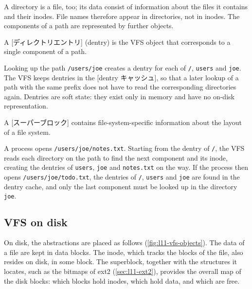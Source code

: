 \documentclass[../main.tex]{subfiles}
\begin{document}
A directory is a file, too; its data consist of information about the files
it contains and their inodes.  File names therefore appear in directories,
not in inodes.  The components of a path are represented by further objects.

\begin{definition}
  A [ディレクトリエントリ]%
   (dentry) is the VFS object that
  corresponds to a single component of a path.
\end{definition}

Looking up the path \texttt{/users/joe} creates a dentry for each of
\texttt{/}, \texttt{users} and \texttt{joe}.  The VFS keeps dentries in the
[dentry キャッシュ], so that a later lookup of a path with
the same prefix
does not have to read the corresponding directories again.  Dentries are
soft state: they exist only in memory and have no on-disk representation.

\begin{definition}[Superblock]
  A [スーパーブロック] contains file-system-specific
  information about the layout of a file system.
\end{definition}

\begin{example}
  A process opens \texttt{/users/joe/notes.txt}.  Starting from the dentry
  of \texttt{/}, the VFS reads each directory on the path to find the next
  component and its inode, creating the dentries of \texttt{users},
  \texttt{joe} and \texttt{notes.txt} on the way.  If the process then opens
  \texttt{/users/joe/todo.txt}, the dentries of \texttt{/}, \texttt{users}
  and \texttt{joe} are found in the dentry cache, and only the last
  component must be looked up in the directory \texttt{joe}.
\end{example}

\subsection{VFS on disk}

On disk, the abstractions are placed as follows (\cref{fig:l11-vfs-objects}).
The data of a file are kept in data blocks.  The inode, which tracks the
blocks of the file, also resides on disk, in some block.  The superblock,
together with the structures it locates, such as the bitmaps of ext2
(\cref{sec:l11-ext2}), provides the overall map of the disk blocks: which
blocks hold inodes, which hold data, and which are free.
\end{document}
